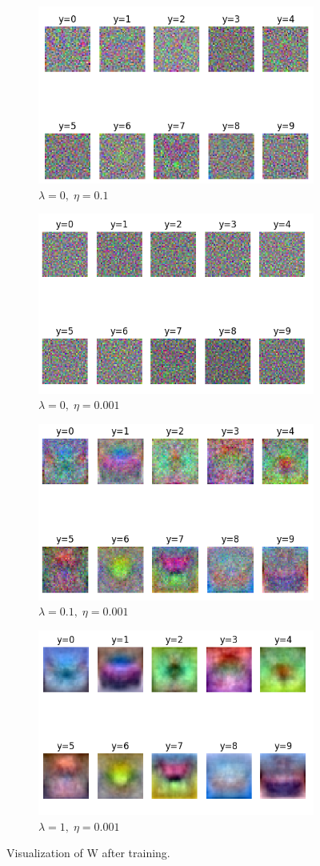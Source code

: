 \documentclass[a4paper]{article}
\begin{document}
\begin{figure}[h]
	\centering
	\begin{subfigure}{\textwidth}
		\centering
		\includegraphics[width=.5\linewidth]{images/weights_eta=0.1_lambda=0.png}
		\caption{$\lambda=0, \; \eta = 0.1$ }
	\end{subfigure}
	
	\begin{subfigure}{\textwidth}
		\centering
		\includegraphics[width=.5\linewidth]{images/weights_eta=0.001_lambda=0.png}
		\caption{$\lambda=0, \; \eta = 0.001$ }
	\end{subfigure}
	
	\begin{subfigure}{\textwidth}
		\centering
		\includegraphics[width=.5\linewidth]{images/weights_eta=0.001_lambda=0.1.png}
		\caption{$\lambda=0.1, \; \eta = 0.001$ }
	\end{subfigure}
	
	\begin{subfigure}{\textwidth}
		\centering
		\includegraphics[width=.5\linewidth]{images/weights_eta=0.001_lambda=1.png}
		\caption{$\lambda=1, \; \eta = 0.001$ }
	\end{subfigure}
	
	\caption{Visualization of W after training.}
	\label{fig:w_vis}
\end{figure}
\end{document}

